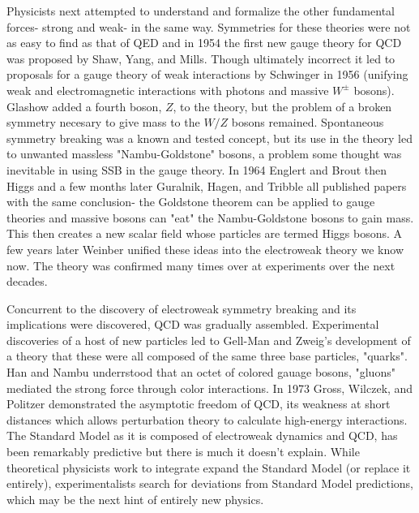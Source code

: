 Physicists next attempted to understand and formalize the other fundamental forces- strong and weak- in the same way. Symmetries for these theories were not as easy to find as that of QED and in 1954 the first new gauge theory for QCD was proposed by Shaw, Yang, and Mills. Though ultimately incorrect it led to proposals for a gauge theory of weak interactions by Schwinger in 1956 (unifying weak and electromagnetic interactions with photons and massive $W^\pm$ bosons). Glashow added a fourth boson, $Z$, to the theory, but the problem of a broken symmetry necesary to give mass to the $W/Z$ bosons remained. Spontaneous symmetry breaking was a known and tested concept, but its use in the theory led to unwanted massless "Nambu-Goldstone" bosons, a problem some thought was inevitable in using SSB in the gauge theory. In 1964 Englert and Brout then Higgs and a few months later Guralnik, Hagen, and Tribble all published papers with the same conclusion- the Goldstone theorem can be applied to gauge theories and massive bosons can "eat" the Nambu-Goldstone bosons to gain mass. This then creates a new scalar field whose particles are termed Higgs bosons. A few years later Weinber unified these ideas into the electroweak theory we know now. The theory was confirmed many times over at experiments over the next decades. 

Concurrent to the discovery of electroweak symmetry breaking and its implications were discovered, QCD was gradually assembled. Experimental discoveries of a host of new particles led to Gell-Man and Zweig's development of a theory that these were all composed of the same three base particles, "quarks". Han and Nambu underrstood that an octet of colored gauage bosons, "gluons" mediated the strong force through color interactions. In 1973 Gross, Wilczek, and Politzer demonstrated the asymptotic freedom of QCD, its weakness at short distances which allows perturbation theory to calculate high-energy interactions. The Standard Model as it is composed of electroweak dynamics and QCD, has been remarkably predictive but there is much it doesn't explain. While theoretical physicists work to integrate expand the Standard Model (or replace it entirely), experimentalists search for deviations from Standard Model predictions, which may be the next hint of entirely new physics. 

